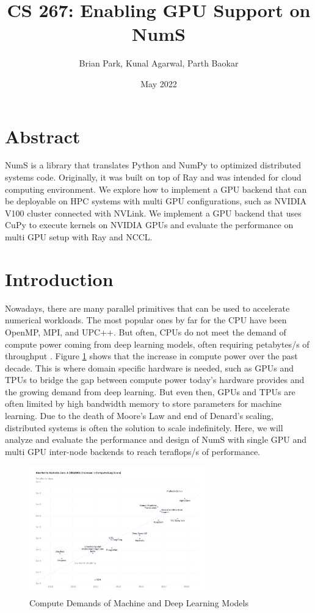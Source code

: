 \documentclass{article}
\title{CS 267: Enabling GPU Support on NumS}
\author{Brian Park, Kunal Agarwal, Parth Baokar}
\date{May 2022}
\begin{document}
\maketitle

\section*{Abstract}
NumS is a library that translates Python and NumPy to optimized distributed systems code. Originally, it was built on top of Ray and was intended for cloud computing environment. We explore how to implement a GPU backend that can be deployable on HPC systems with multi GPU configurations, such as NVIDIA V100 cluster connected with NVLink. We implement a GPU backend that uses CuPy to execute kernels on NVIDIA GPUs and evaluate the performance on multi GPU setup with Ray and NCCL.

\section{Introduction}
Nowadays, there are many parallel primitives that can be used to accelerate numerical workloads. The most popular ones by far for the CPU have been OpenMP, MPI, and UPC++. But often, CPUs do not meet the demand of compute power coming from deep learning models, often requiring petabytes/s of throughput \cite{openai}. Figure \ref{fig:openai} shows that the increase in compute power over the past decade. This is where domain specific hardware is needed, such as GPUs and TPUs to bridge the gap between compute power today's hardware provides and the growing demand from deep learning. But even then, GPUs and TPUs are often limited by high bandwidth memory to store parameters for machine learning. Due to the death of Moore's Law and end of Denard's scaling, distributed systems is often the solution to scale indefinitely. Here, we will analyze and evaluate the performance and design of NumS with single GPU and multi GPU inter-node backends to reach teraflops/s of performance.

\begin{figure}
  \centerline{\includegraphics[width=3in]{figures/ai-and-compute-modern-log.png}}
  \caption{Compute Demands of Machine and Deep Learning Models}
  \label{fig:openai}
\end{figure}
\end{document}
